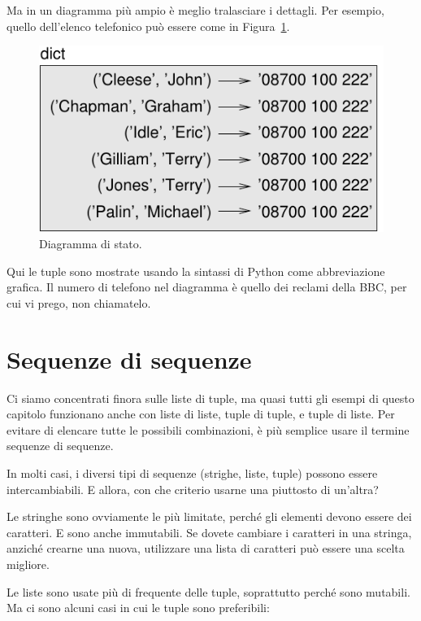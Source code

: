 \documentclass[10pt]{book}
\begin{document}
Ma in un diagramma più ampio è meglio tralasciare i dettagli. Per esempio, quello dell'elenco telefonico può essere come in Figura~\ref{fig.dict2}.

\begin{figure}
\centerline
{\includegraphics[scale=0.8]{figs/dict2.pdf}}
\caption{Diagramma di stato.}
\label{fig.dict2}
\end{figure}

Qui le tuple sono mostrate usando la sintassi di Python come abbreviazione grafica. Il numero di telefono nel diagramma è quello dei reclami della BBC, per cui vi prego, non chiamatelo.


\section{Sequenze di sequenze}

Ci siamo concentrati finora sulle liste di tuple, ma quasi tutti gli esempi di questo capitolo funzionano anche con liste di liste, tuple di tuple, e tuple di liste. Per evitare di elencare tutte le possibili combinazioni, è più semplice usare il termine sequenze di sequenze.

In molti casi, i diversi tipi di sequenze (strighe, liste, tuple) possono essere intercambiabili. E allora, con che criterio usarne una piuttosto di un'altra?

Le stringhe sono ovviamente le più limitate, perché gli elementi devono essere dei caratteri. E sono anche immutabili. Se dovete cambiare i caratteri in una stringa, anziché crearne una nuova, utilizzare una lista di caratteri può essere una scelta migliore.

Le liste sono usate più di frequente delle tuple, soprattutto perché sono mutabili. Ma ci sono alcuni casi in cui le tuple sono preferibili:
\end{document}
